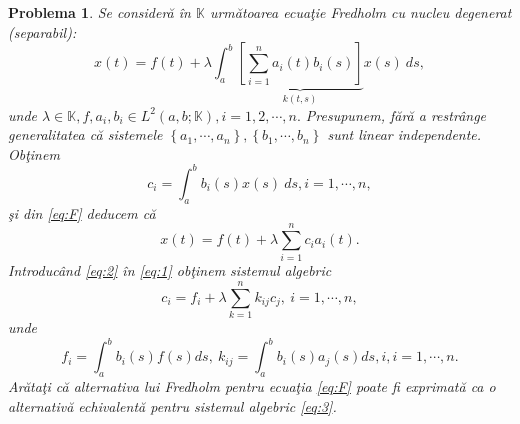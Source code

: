 \documentclass[a4paper,12pt,oneside]{report}
\newtheorem{problem}{Problema}
\begin{document}
  	      			      			      	
\begin{problem}
Se consider\u{a} \^{i}n \(\mathbb{K}\)  urm\u{a}toarea ecua\c{t}ie Fredholm cu nucleu degenerat (separabil):
\begin{displaymath}
  x\left (  t\right ) = f\left ( t \right ) + \lambda \int_{a}^{b}\underbrace{ \left [ \sum_{i = 1}^{n}a_{i}\left ( t \right )b_{i}\left ( s \right ) \right ]}_{k\left ( t,s \right )}x\left ( s \right ) \ ds , \label{eq:F} \tag{F}
\end{displaymath}
unde \(\lambda \in \mathbb{K} , f, a_{i}, b_{i} \in L^{2} \left ( a,b; \mathbb{K} \right ), i = 1,2,\cdots,n.\) Presupunem, f\u{a}r\u{a} a restr\^{a}nge generalitatea c\u{a} sistemele \(\left \{ a_{1},\cdots ,a_{n} \right \}, \left \{ b_{1},\cdots ,b_{n} \right \}\) sunt linear independente. Ob\c{t}inem
\begin{displaymath}
  c_{i} = \int_{a}^{b} b_{i}\left ( s \right )x\left ( s \right )\ ds, i = 1,\cdots ,n, \label{eq:1} \tag{1}
\end{displaymath}
\c{s}i din  \ref{eq:F} deducem c\u{a}
\begin{displaymath}
  x\left ( t \right ) = f\left ( t \right ) + \lambda \sum_{i=1}^{n}c_{i}a_{i}\left ( t \right ). \label{eq:2} \tag{2}
\end{displaymath}
Introduc\^{a}nd \ref{eq:2} \^{i}n \ref{eq:1} ob\c{t}inem sistemul algebric
\begin{displaymath}
  c_{i} = f_{i} + \lambda \sum_{k = 1}^{n}k_{ij}c_{j},~ i = 1,\cdots ,n , \label{eq:3} \tag{3}
\end{displaymath}
unde
\begin{displaymath}
  f_{i} = \int_{a}^{b} b_{i}\left ( s \right )f\left ( s \right )ds,~ k_{ij} = \int_{a}^{b}b_{i}\left ( s \right )a_{j}\left ( s \right )ds, i,i = 1,\cdots,n.
\end{displaymath}
Ar\u{a}ta\c{t}i c\u{a} alternativa lui Fredholm pentru ecua\c{t}ia \ref{eq:F} poate fi exprimat\u{a} ca o alternativ\u{a} echivalent\u{a} pentru sistemul algebric \ref{eq:3}.
\end{problem}
  	      			      	
\end{document}
